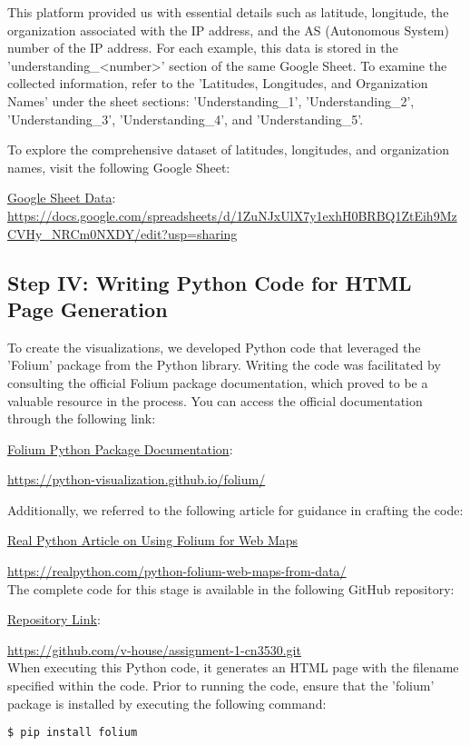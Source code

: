 \documentclass{article}
\begin{document}
This platform provided us with essential details such as latitude, longitude, the organization associated with the IP address, and the AS (Autonomous System) number of the IP address. For each example, this data is stored in the 'understanding\_<number>' section of the same Google Sheet. To examine the collected information, refer to the 'Latitudes, Longitudes, and Organization Names' under the sheet sections: 'Understanding\_1', 'Understanding\_2', 'Understanding\_3', 'Understanding\_4', and 'Understanding\_5'.

To explore the comprehensive dataset of latitudes, longitudes, and organization names, visit the following Google Sheet:

\href{https://docs.google.com/spreadsheets/d/1ZuNJxUlX7y1exhH0BRBQ1ZtEih9MzCVHy_NRCm0NXDY/edit?usp=sharing}{Google Sheet Data}: \\ \url{https://docs.google.com/spreadsheets/d/1ZuNJxUlX7y1exhH0BRBQ1ZtEih9MzCVHy_NRCm0NXDY/edit?usp=sharing}

\subsection{Step IV: Writing Python Code for HTML Page Generation}

To create the visualizations, we developed Python code that leveraged the 'Folium' package from the Python library. Writing the code was facilitated by consulting the official Folium package documentation, which proved to be a valuable resource in the process. You can access the official documentation through the following link:

\href{https://python-visualization.github.io/folium/}{Folium Python Package Documentation}:

\url{https://python-visualization.github.io/folium/}

Additionally, we referred to the following article for guidance in crafting the code:

\href{https://realpython.com/python-folium-web-maps-from-data/}{Real Python Article on Using Folium for Web Maps}

\url{https://realpython.com/python-folium-web-maps-from-data/}
\\
The complete code for this stage is available in the following GitHub repository:

\href{https://github.com/v-house/assignment-1-cn3530.git}{Repository Link}:

\url{https://github.com/v-house/assignment-1-cn3530.git}
\\
When executing this Python code, it generates an HTML page with the filename specified within the code. Prior to running the code, ensure that the 'folium' package is installed by executing the following command:
\begin{verbatim}
$ pip install folium
\end{verbatim}
\end{document}
